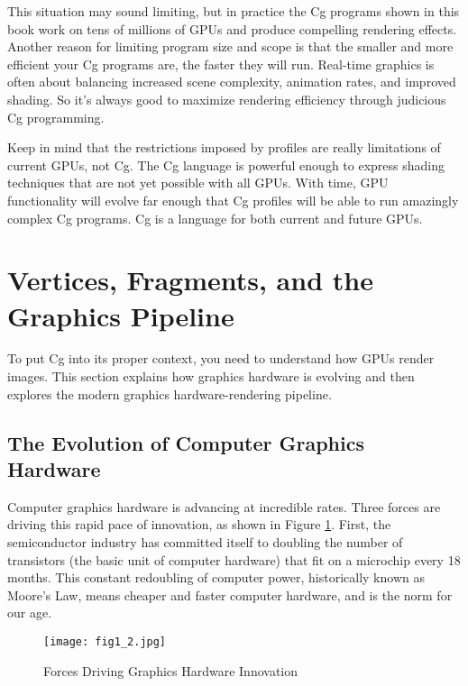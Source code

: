 \documentclass[../main.tex]{subfiles}
\begin{document}
This situation may sound limiting, but in practice the Cg programs shown in this book work on tens of millions of GPUs and produce compelling rendering effects. Another reason for limiting program size and scope is that the smaller and more efficient your Cg programs are, the faster they will run. Real-time graphics is often about balancing increased scene complexity, animation rates, and improved shading. So it's always good to maximize rendering efficiency through judicious Cg programming.

Keep in mind that the restrictions imposed by profiles are really limitations of current GPUs, not Cg. The Cg language is powerful enough to express shading techniques that are not yet possible with all GPUs. With time, GPU functionality will evolve far enough that Cg profiles will be able to run amazingly complex Cg programs. Cg is a language for both current and future GPUs.

\section{Vertices, Fragments, and the Graphics Pipeline}

To put Cg into its proper context, you need to understand how GPUs render images. This section explains how graphics hardware is evolving and then explores the modern graphics hardware-rendering pipeline.

\subsection{The Evolution of Computer Graphics Hardware}

Computer graphics hardware is advancing at incredible rates. Three forces are driving this rapid pace of innovation, as shown in Figure \ref{fig:1-2}. First, the semiconductor industry has committed itself to doubling the number of transistors (the basic unit of computer hardware) that fit on a microchip every 18 months. This constant redoubling of computer power, historically known as Moore's Law, means cheaper and faster computer hardware, and is the norm for our age.

\begin{figure}
    \centering
    \texttt{[image: fig1\_2.jpg]}
    \caption{Forces Driving Graphics Hardware Innovation}
    \label{fig:1-2}
\end{figure}
\end{document}
